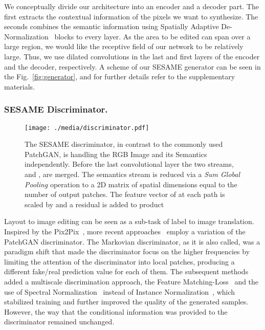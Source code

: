 \documentclass[runningheads]{llncs}
\newcommand{\fref}[1]{Fig.~\ref{#1}}
\newcommand{\aref}[1]{the supplementary materials}
\begin{document}
We conceptually divide our architecture into an encoder and a decoder part. The first extracts the contextual information of the pixels we want to synthesize. 
The seconds combines the semantic information using Spatially Adaptive De-Normalization~\cite{park2019SPADE} blocks to every layer. As the area to be edited can span over a large region, we would like the receptive field of our network to be relatively large. Thus, we use dilated convolutions in the last and first layers of the encoder and the decoder, respectively. A scheme of our SESAME generator can be seen in the \fref{fig:generator}, and for further details refer to \aref{}.

\subsubsection{SESAME Discriminator.}
\label{ss:discriminator}

\begin{figure}[t]
\begin{center}
    \centering
    \texttt{[image: ./media/discriminator.pdf]}
    \caption{The SESAME discriminator, in contrast to the commonly used PatchGAN, is handling the RGB Image and its Semantics independently.
    Before the last convolutional layer the two streams,  and , are merged. The semantics stream is reduced via a \textit{Sum Global Pooling} operation to a 2D matrix of spatial dimensions equal to the number of output patches.
    The feature vector of  at each path is scaled by  and a residual is added to product
    }
    \label{fig:discriminator}
\end{center}
\end{figure}
Layout to image editing can be seen as a sub-task of label to image translation.
Inspired by the Pix2Pix~\cite{isola2017image}, more recent approaches~\cite{wang2018pix2pixHD,park2019SPADE} employ a variation of the PatchGAN discriminator.
The Markovian discriminator, as it is also called, was a paradigm shift that made the discriminator focus on the higher frequencies by limiting the attention of the discriminator into local patches, producing a different fake/real prediction value for each of them.
The subsequent methods added a multiscale discrimination approach, the Feature Matching-Loss~\cite{wang2018pix2pixHD} and the use of Spectral Normalization~\cite{miyato2018spectral} instead of Instance Normalization~\cite{park2019SPADE}, which stabilized training and further improved the quality of the generated samples.
However, the way that the conditional information was provided to the discriminator remained unchanged.
\end{document}
